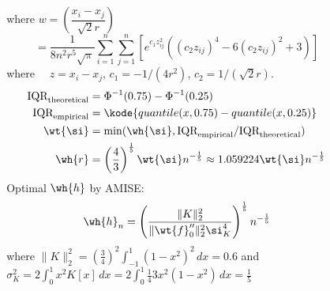 \begin{frame}
\begin{columns}
\begin{column}{0.48\textwidth}
			
		\end{column}
		\begin{column}{0.48\textwidth}
			where $w = \left( \dfrac{x_i-x_j}{\sqrt{2}r} \right)$
			\begin{equation}
			\label{eq:04}
				= \dfrac{1}{8n^2r^5\sqrt{\pi}} \sum_{i=1}^n \sum_{j=1}^n\left[ e^{c_1z_{ij}^2} \left( (c_2z_{ij})^4 - 6(c_2z_{ij})^2 + 3 \right) \right]
			\end{equation}
			where $\quad z = x_i - x_j$, $c_1 = -1/(4r^2)$, $c_2 = 1/(\sqrt{2}r)$.
			\begin{equation}
			\label{eq:05}
				\begin{aligned}
					\text{IQR}_{\text{theoretical}} &= \Phi^{-1}(0.75) - \Phi^{-1}(0.25)\\
					\text{IQR}_{\text{empirical}} &= \kode{quantile(x, 0.75) - quantile(x, 0.25)}\\
					\wt{\si} &= \min(\wh{\si}, \text{IQR}_{\text{empirical}}/\text{IQR}_{\text{theoretical}})\\
					\wh{r} &= \left(\dfrac{4}{3}\right)^{\frac{1}{5}} \wt{\si}n^{-\frac{1}{5}} \approx 1.059224  \wt{\si}n^{-\frac{1}{5}}
				\end{aligned}
			\end{equation}
			Optimal $\wh{h}$ by AMISE:
			\begin{equation}
			\label{eq:06}
				\wh{h}_n = \left( \dfrac{\lVert K \rVert_2^2}{\lVert \wt{f}_0'' \rVert_2^2 \si_K^4} \right)^{\frac{1}{5}} n^{-\frac{1}{5}}
			\end{equation}
			where $\lVert K \rVert_2^2 = \left(\frac{3}{4}\right)^2 \int_{-1}^1 \left(1-x^2\right)^2 \, dx = 0.6$ and\\
			$\sigma _K^2=2 \int_0^1 x^2 K[x] \, dx=2 \int_0^1 \frac{1}{4} 3 x^2 \left(1-x^2\right) \, dx=\frac{1}{5}$
		\end{column}
	\end{columns}
\end{frame}




